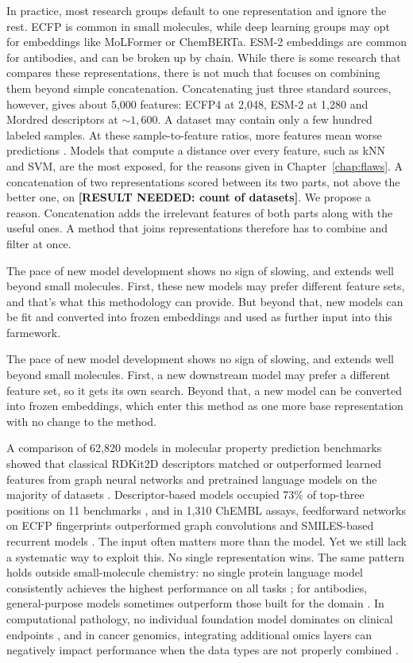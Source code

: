 In practice, most research groups default to one representation and ignore the rest. ECFP is common in small molecules, while deep learning groups may opt for embeddings like MoLFormer or ChemBERTa. ESM-2 embeddings are common for antibodies, and can be broken up by chain. While there is some research that compares these representations, there is not much that focuses on combining them beyond simple concatenation. Concatenating just three standard sources, however, gives about 5,000 features: ECFP4 at 2,048, ESM-2 at 1,280 and Mordred descriptors at ${\sim}1{,}600$. A dataset may contain only a few hundred labeled samples. At these sample-to-feature ratios, more features mean worse predictions \citep{Hughes1968, Bellman1961}. Models that compute a distance over every feature, such as kNN and SVM, are the most exposed, for the reasons given in Chapter~\ref{chap:flaws}. A concatenation of two representations scored between its two parts, not above the better one, on \textbf{[RESULT NEEDED: count of datasets]}. We propose a reason. Concatenation adds the irrelevant features of both parts along with the useful ones. A method that joins representations therefore has to combine and filter at once.

The pace of new model development shows no sign of slowing, and extends well beyond small molecules. First, these new models may prefer different feature sets, and that's what this methodology can provide. But beyond that, new models can be fit and converted into frozen embeddings and used as further input into this farmework. 

The pace of new model development shows no sign of slowing, and extends well beyond small molecules. First, a new downstream model may prefer a different feature set, so it gets its own search. Beyond that, a new model can be converted into frozen embeddings, which enter this method as one more base representation with no change to the method.

A comparison of 62,820 models in molecular property prediction benchmarks showed that classical RDKit2D descriptors matched or outperformed learned features from graph neural networks and pretrained language models on the majority of datasets \citep{Deng2023}. Descriptor-based models occupied 73\% of top-three positions on 11 benchmarks \citep{Jiang2021}, and in 1,310 ChEMBL assays, feedforward networks on ECFP fingerprints outperformed graph convolutions and SMILES-based recurrent models \citep{Mayr2018}. The input often matters more than the model. Yet we still lack a systematic way to exploit this. No single representation wins. The same pattern holds outside small-molecule chemistry: no single protein language model consistently achieves the highest performance on all tasks \citep{Kenlay2024, Schmirler2024}; for antibodies, general-purpose models sometimes outperform those built for the domain \citep{Kenlay2024}. In computational pathology, no individual foundation model dominates on clinical endpoints \citep{ElNahhas2025}, and in cancer genomics, integrating additional omics layers can negatively impact performance when the data types are not properly combined \citep{Steyaert2023}.

